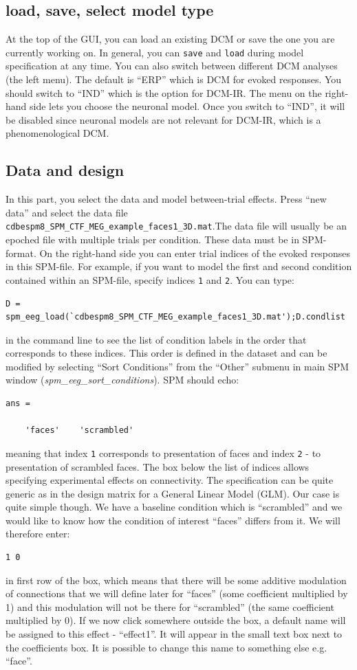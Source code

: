 \subsection{load, save, select model type}
At the top of the GUI, you can load an existing DCM or save the one you are currently working on. In general, you can \texttt{save} and \texttt{load} during model specification at any time. You can also switch between different DCM analyses (the left menu). The default is ``ERP'' which is DCM for evoked responses. You should switch to ``IND'' which is the option for DCM-IR. The menu on the right-hand side lets you choose the neuronal model. Once you switch to ``IND'', it will be disabled since neuronal models are not relevant for DCM-IR, which is a phenomenological DCM.

\subsection{Data and design}
In this part, you select the data and model between-trial effects. Press ``new data'' and select the data file \texttt{cdbespm8\_\-SPM\_\-CTF\_\-MEG\_\-example\_\-faces1\_\-3D.mat}.The data file will usually be an epoched file with multiple trials per condition. These data must be in SPM-format. On the right-hand side you can enter trial indices of the evoked responses in this SPM-file. For example, if you want to model the first and second condition contained within an SPM-file, specify
indices \texttt{1} and \texttt{2}. You can type:
\begin{verbatim}
D = spm_eeg_load(`cdbespm8_SPM_CTF_MEG_example_faces1_3D.mat');D.condlist
\end{verbatim}
in the command line to see the list of condition labels in the order that corresponds to these indices. This order is defined in the dataset and can be modified by selecting ``Sort Conditions'' from the ``Other'' submenu in main SPM window (\textit{spm\_eeg\_sort\_conditions}). SPM should echo:
\begin{verbatim}
ans = 

    'faces'    'scrambled'
\end{verbatim}
meaning that index \texttt{1} corresponds to presentation of faces and index \texttt{2} - to presentation of scrambled faces. The box below the list of indices allows specifying experimental effects on connectivity. The specification can be quite generic as in the design matrix for a General Linear Model (GLM). Our case is quite simple though. We have a baseline condition which is ``scrambled'' and we would like to know how the condition of interest ``faces'' differs from it. We will therefore enter:
\begin{verbatim}
1 0
\end{verbatim}
in first row of the box, which means that there will be some additive modulation of connections that we will define later for ``faces''  (some coefficient multiplied by 1) and this modulation will not be there for ``scrambled'' (the same coefficient multiplied by 0). If we now click somewhere outside the box, a default name will be assigned to this effect - ``effect1''. It will appear in the small text box next to the coefficients box. It is possible to change this name to something else e.g. ``face''.

